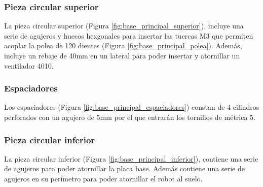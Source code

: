 \subsubsection{Pieza circular superior}
\noindent La pieza circular superior (Figura \ref{fig:base_principal_superior}), incluye una serie de agujeros y huecos hexgonales para insertar las tuercas M3 que permiten
acoplar la polea de 120 dientes (Figura \ref{fig:base_principal_polea}). Además, incluye un rebaje de 40mm en un lateral para poder insertar y atornillar un ventilador 4010.
\subsubsection{Espaciadores}
\noindent Los espaciadores (Figura \ref{fig:base_principal_espaciadores}) constan de 4 cilindros perforados con un agujero de 5mm por el que entrarán los tornillos de métrica 5.
\subsubsection{Pieza circular inferior}
\noindent La pieza circular inferior (Figura \ref{fig:base_principal_inferior}), contiene una serie de agujeros para poder atornillar la placa base. Además contiene una serie de agujeros en su perímetro 
para poder atornillar el robot al suelo. 

